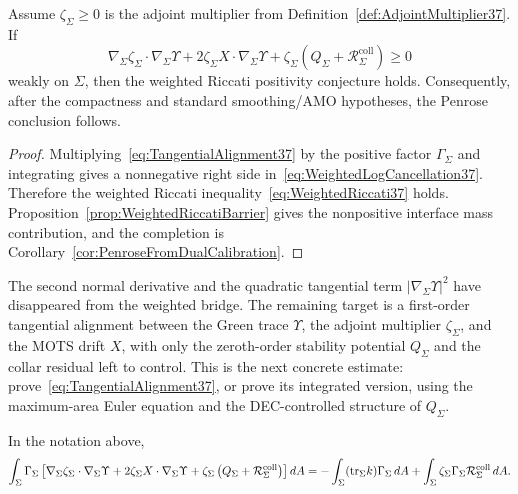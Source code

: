 \begin{theorem}\label{thm:TangentialDriftAlignment}
Assume \(\zeta_\Sigma\ge0\) is the adjoint multiplier from Definition~\ref{def:AdjointMultiplier37}. If
\begin{equation}\label{eq:TangentialAlignment37}
    \nabla_\Sigma\zeta_\Sigma\cdot\nabla_\Sigma\Upsilon
    +2\zeta_\Sigma X\cdot\nabla_\Sigma\Upsilon
    +\zeta_\Sigma\left(Q_\Sigma+\mathcal R_\Sigma^{\mathrm{coll}}\right)
    \ge0
\end{equation}
weakly on \(\Sigma\), then the weighted Riccati positivity conjecture holds. Consequently, after the compactness and standard smoothing/AMO hypotheses, the Penrose conclusion follows.
\end{theorem}

\begin{proof}
Multiplying~\eqref{eq:TangentialAlignment37} by the positive factor \(\Gamma_\Sigma\) and integrating gives a nonnegative right side in~\eqref{eq:WeightedLogCancellation37}. Therefore the weighted Riccati inequality~\eqref{eq:WeightedRiccati37} holds. Proposition~\ref{prop:WeightedRiccatiBarrier} gives the nonpositive interface mass contribution, and the completion is Corollary~\ref{cor:PenroseFromDualCalibration}.
\end{proof}

\begin{remark}\label{rem:AfterCancellation37}
The second normal derivative and the quadratic tangential term \(|\nabla_\Sigma\Upsilon|^2\) have disappeared from the weighted bridge. The remaining target is a first-order tangential alignment between the Green trace \(\Upsilon\), the adjoint multiplier \(\zeta_\Sigma\), and the MOTS drift \(X\), with only the zeroth-order stability potential \(Q_\Sigma\) and the collar residual left to control. This is the next concrete estimate: prove~\eqref{eq:TangentialAlignment37}, or prove its integrated version, using the maximum-area Euler equation and the DEC-controlled structure of \(Q_\Sigma\).
\end{remark}

\begin{lemma}\label{lem:AdjointCollapse37}
In the notation above,
\begin{equation}\label{eq:AdjointCollapse37}
    \int_\Sigma \Gamma_\Sigma
    \left[
        \nabla_\Sigma\zeta_\Sigma\cdot\nabla_\Sigma\Upsilon
        +2\zeta_\Sigma X\cdot\nabla_\Sigma\Upsilon
        +\zeta_\Sigma\left(Q_\Sigma+\mathcal R_\Sigma^{\mathrm{coll}}\right)
    \right]dA
    =
    -\int_\Sigma (\mathrm{tr}_\Sigma k)\Gamma_\Sigma\,dA
    +
    \int_\Sigma \zeta_\Sigma\Gamma_\Sigma
        \mathcal R_\Sigma^{\mathrm{coll}}\,dA .
\end{equation}
\end{lemma}

